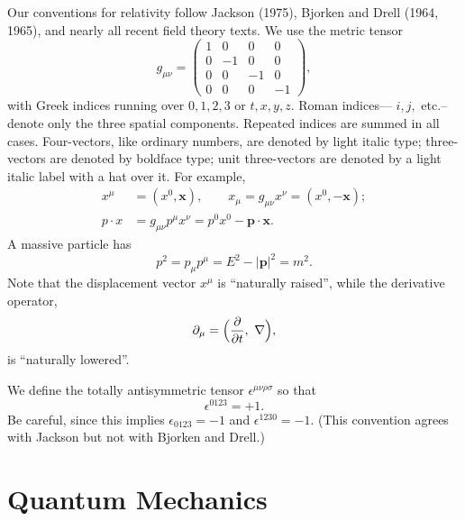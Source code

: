 Our conventions for relativity follow Jackson (1975), Bjorken and Drell
(1964, 1965), and nearly all recent field theory texts.  We use the metric
tensor
\begin{equation}
  g_{\mu\nu} = \begin{pmatrix}
    1 & 0 & 0 & 0\\
    0 & -1 & 0 & 0\\
    0 & 0 & -1 & 0\\
    0 & 0 & 0 & -1
  \end{pmatrix},
\end{equation}
with Greek indices running over $0,1,2,3$ or $t,x,y,z$.  Roman indices---
$i,j,$ etc.\---denote only the three spatial components.  Repeated indices
are summed in all cases.  Four-vectors, like ordinary numbers, are denoted
by light italic type; three-vectors are denoted by boldface type; unit
three-vectors are denoted by a light italic label with a hat over it.
For example,
\begin{align}
  x^\mu &= (x^0, \mathbf{x}),\qquad x_\mu = g_{\mu\nu} x^\nu = (x^0, -\mathbf{x});\\
  p\cdot x &= g_{\mu\nu} p^\mu x^\nu = p^0 x^0 - \mathbf{p}\cdot\mathbf{x}.
\end{align}
A massive particle has
\begin{equation}
  p^2 = p_\mu p^\mu = E^2 - |\mathbf{p}|^2 = m^2 .
\end{equation}
Note that the displacement vector $x^\mu$ is ``naturally raised'', while
the derivative operator,
\begin{equation}
  \partial_\mu = \Bigl( \frac{\partial}{\partial t},\ \nabla \Bigr),
\end{equation}
is ``naturally lowered''.

We define the totally antisymmetric tensor $\epsilon^{\mu\nu\rho\sigma}$ so
that
\begin{equation}
  \epsilon^{0123} = +1 .
\end{equation}
Be careful, since this implies $\epsilon_{0123} = -1$ and
$\epsilon^{1230} = -1$.  (This convention agrees with Jackson but not with
Bjorken and Drell.)

\section*{Quantum Mechanics}

